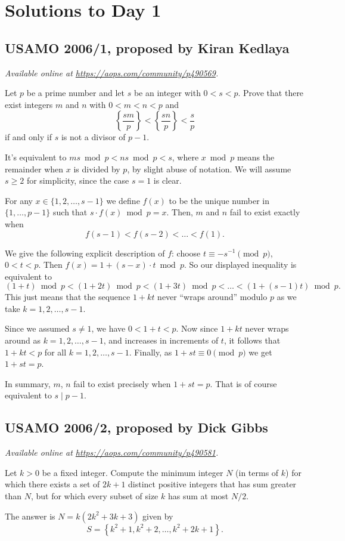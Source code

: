\documentclass[11pt]{scrartcl}
\begin{document}
\section{Solutions to Day 1}
\subsection{USAMO 2006/1, proposed by Kiran Kedlaya}
\textsl{Available online at \url{https://aops.com/community/p490569}.}
\begin{mdframed}[style=mdpurplebox,frametitle={Problem statement}]
Let $p$ be a prime number and let $s$ be an integer with $0 < s < p$.
Prove that there exist integers $m$ and $n$ with $0 < m < n < p$ and
\[ \left \{\frac{sm}{p} \right\} < \left \{\frac{sn}{p} \right \} < \frac{s}{p}  \]
if and only if $s$ is not a divisor of $p-1$.
\end{mdframed}
It's equivalent to $ms \bmod p < ns \bmod p < s$,
where $x \bmod p$ means the remainder when $x$ is divided by $p$,
by slight abuse of notation.
We will assume $s \ge 2$ for simplicity,
since the case $s = 1$ is clear.

For any $x \in \{1, 2, \dots, s-1\}$
we define $f(x)$ to be the unique number in $\{1, \dots, p-1\}$
such that $s \cdot f(x) \bmod p = x$.
Then, $m$ and $n$ fail to exist exactly when
\[ f(s-1) < f(s-2) < \dots < f(1). \]

We give the following explicit description of $f$:
choose $t \equiv -s^{-1} \pmod p$, $0 < t < p$.
Then $f(x) = 1 + (s-x) \cdot t \bmod p$.
So our displayed inequality is equivalent to
\[ (1+t) \bmod p < (1+2t) \bmod p < (1+3t) \bmod p
  < \dots < (1+(s-1)t) \bmod p. \]
This just means that the sequence $1+kt$
never ``wraps around'' modulo $p$
as we take $k=1,2,\dots,s-1$.

Since we assumed $s \neq 1$, we have $0 < 1+t < p$.
Now since $1+kt$ never wraps around as $k=1,2,\dots,s-1$,
and increases in increments of $t$,
it follows that $1+kt < p$ for all $k = 1, 2, \dots, s-1$.
Finally, as $1+st \equiv 0 \pmod p$ we get $1+st=p$.

In summary, $m$, $n$ fail to exist
precisely when $1 + st = p$.
That is of course equivalent to $s \mid p-1$.
\pagebreak

\subsection{USAMO 2006/2, proposed by Dick Gibbs}
\textsl{Available online at \url{https://aops.com/community/p490581}.}
\begin{mdframed}[style=mdpurplebox,frametitle={Problem statement}]
Let $k > 0$ be a fixed integer.
Compute the minimum integer $N$ (in terms of $k$) for which
there exists a set of $2k+1$ distinct positive integers
that has sum greater than $N$,
but for which every subset of size $k$ has sum at most $N/2$.
\end{mdframed}
The answer is $N = k(2k^2+3k+3)$ given by
\[ S = \left\{ k^2+1, k^2+2, \dots, k^2+2k+1 \right\}. \]
\end{document}
